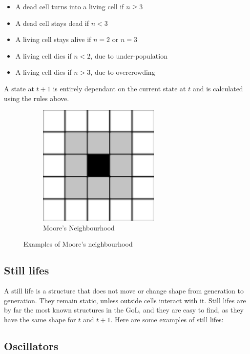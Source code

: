 \documentclass{l4proj}
\begin{document}
\begin{itemize}
    \item A dead cell turns into a living cell if $n \geq 3$
    \item A dead cell stays dead if $n < 3$
    \item A living cell stays alive if $n = 2$ or $n = 3$
    \item A living cell dies if $n < 2$, due to under-population
    \item A living cell dies if $n > 3$, due to overcrowding
\end{itemize}

A state at $t+1$ is entirely dependant on the current state at $t$ and is calculated using the rules above.

\begin{figure}[h]

\begin{subfigure}{0.5\textwidth}
\includegraphics[width=0.9\linewidth, height=6cm]{dissertation/images/moores_law.png} 
\caption{Moore's Neighbourhood}
\label{fig:subim1}
\end{subfigure}

\caption{Examples of Moore's neighbourhood}
\label{fig:image2}
\end{figure}

\subsection{Still lifes}

A still life is a structure that does not move or change shape from generation to generation. They remain static, unless outside cells interact with it. Still lifes are by far the most known structures in the GoL, and they are easy to find, as they have the same shape for $t$ and $t+1$. Here are some examples of still lifes:

\subsection{Oscillators}
\end{document}
